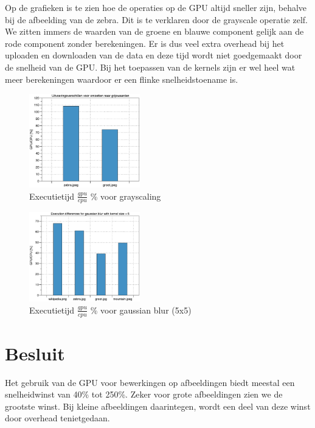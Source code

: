 \documentclass[10pt, twocolumn, a4paper]{article}
\begin{document}
Op de grafieken is te zien hoe de operaties op de GPU altijd sneller zijn, behalve bij de afbeelding van de zebra. Dit is te verklaren door de grayscale operatie zelf. We zitten immers de waarden van de groene en blauwe component gelijk aan de rode component zonder berekeningen. Er is dus veel extra overhead bij het uploaden en downloaden van de data en deze tijd wordt niet goedgemaakt door de snelheid van de GPU. Bij het toepassen van de kernels zijn er wel heel wat meer berekeningen waardoor er een flinke snelheidstoename is.

\begin{figure}
    \centering
    \includegraphics[width=0.43\textwidth]{grayscaling.eps}
    \caption{Executietijd $\frac{gpu}{cpu}$ \% voor grayscaling}
    \label{blocksize}
\end{figure}

\begin{figure}[H]
    \centering
    \includegraphics[width=0.43\textwidth]{gaussian_blur.eps}
    \caption{Executietijd $\frac{gpu}{cpu}$ \% voor gaussian blur (5x5)}
    \label{blocksize}
\end{figure}

\section{Besluit}
Het gebruik van de GPU voor bewerkingen op afbeeldingen biedt meestal een snelheidwinst van 40\% tot 250\%. Zeker voor grote afbeeldingen zien we de grootste winst. Bij kleine afbeeldingen daarintegen, wordt een deel van deze winst door overhead tenietgedaan.
\end{document}
